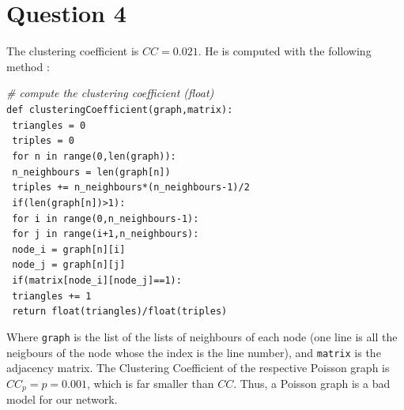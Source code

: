 \documentclass[a4paper]{report}
\begin{document}
\section*{Question 4}
The clustering coefficient is $CC=0.021$. He is computed with the following method :

\medbreak
\noindent     \textit{\# compute the clustering coefficient (float)}\\
\noindent     \texttt{def clusteringCoefficient(graph,matrix):}\\
\hspace*{1cm} \texttt{	triangles = 0}\\
\hspace*{1cm} \texttt{	triples = 0}\\
\hspace*{1cm} \texttt{	for n in range(0,len(graph)):}\\
\hspace*{2cm} \texttt{		n\_neighbours = len(graph[n])}\\
\hspace*{2cm} \texttt{		triples += n\_neighbours*(n\_neighbours-1)/2}\\
\hspace*{2cm} \texttt{		if(len(graph[n])>1):}\\
\hspace*{3cm} \texttt{			for i in range(0,n\_neighbours-1):}\\
\hspace*{4cm} \texttt{				for j in range(i+1,n\_neighbours):}\\
\hspace*{5cm} \texttt{					node\_i = graph[n][i]}\\
\hspace*{5cm} \texttt{					node\_j = graph[n][j]}\\
\hspace*{5cm} \texttt{					if(matrix[node\_i][node\_j]==1):}\\
\hspace*{6cm} \texttt{						triangles += 1}\\
\hspace*{1cm} \texttt{	return float(triangles)/float(triples)}\\
\medbreak

Where \texttt{graph} is the list of the lists of neighbours of each node (one line is all the neigbours of the node whose the index is the line number), and \texttt{matrix} is the adjacency matrix.
\medbreak
The Clustering Coefficient of the respective Poisson graph is $CC_p = p = 0.001$, which is far smaller than $CC$. Thus, a Poisson graph is a bad model for our network.
\end{document}
